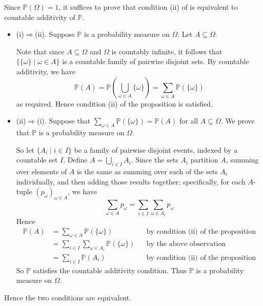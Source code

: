 \begin{cproof}
Since $\mathbb{P}(\Omega)=1$, it suffices to prove that condition (ii) of  is equivalent to countable additivity of $\mathbb{P}$.

\begin{itemize}
\item (i)$\Rightarrow$(ii). Suppose $\mathbb{P}$ is a probability measure on $\Omega$. Let $A \subseteq \Omega$.

Note that since $A \subseteq \Omega$ and $\Omega$ is countably infinite, it follows that $\{ \{ \omega \} \mid \omega \in A \}$ is a countable family of pairwise disjoint sets. By countable additivity, we have
\[ \mathbb{P}(A) = \mathbb{P}\left( \bigcup_{\omega \in A} \{ \omega \} \right) = \sum_{\omega \in A} \mathbb{P}(\{\omega\}) \]
as required. Hence condition (ii) of the proposition is satisfied.

\item (ii)$\Rightarrow$(i). Suppose that $\sum_{\omega \in A} \mathbb{P}(\{\omega\}) = \mathbb{P}(A)$ for all $A \subseteq \Omega$. We prove that $\mathbb{P}$ is a probability measure on $\Omega$.

So let $\{ A_i \mid i \in I \}$ be a family of pairwise disjoint events, indexed by a countable set $I$. Define $A = \bigcup_{i \in I} A_i$. Since the sets $A_i$ partition $A$, summing over elements of $A$ is the same as summing over each of the sets $A_i$ individually, and then adding those results together; specifically, for each $A$-tuple $(p_{\omega})_{\omega \in A}$, we have
\[ \sum_{\omega \in A} p_{\omega} = \sum_{i \in I} \sum_{\omega \in A_i} p_{\omega} \]
Hence
\begin{align*}
\mathbb{P}(A) &= \sum_{\omega \in A} \mathbb{P}(\{\omega\}) && \text{by condition (ii) of the proposition} \\
&= \sum_{i \in I} \sum_{\omega \in A_i} \mathbb{P}(\{\omega\}) && \text{by the above observation} \\
&= \sum_{i \in I} \mathbb{P}(A_i) && \text{by condition (ii) of the proposition}
\end{align*}
So $\mathbb{P}$ satisfies the countable additivity condition. Thus $\mathbb{P}$ is a probability measure on $\Omega$.
\end{itemize}
Hence the two conditions are equivalent.
\end{cproof}


